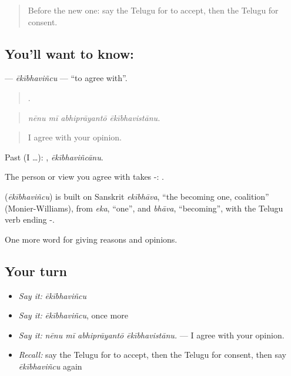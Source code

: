\label{lesson:TE-C385-ekibhavincu}



\begin{quote}
Before the new one: say the Telugu for to accept, then the Telugu for consent.
\end{quote}

\subsection*{You'll want to know: }
\textbf{} — \emph{ēkībhaviñcu} — \textquotedblleft{}to agree with\textquotedblright{}.

\begin{quote}
   .
\end{quote}

\begin{quote}
\emph{nēnu mī abhiprāyantō ēkībhavistānu.}
\end{quote}

\begin{quote}
I agree with your opinion.
\end{quote}

Past (I …): , \emph{ēkībhaviñcānu}.

The person or view you agree with takes -:  .

\begin{cousinweb}
\textbf{} (\emph{ēkībhaviñcu}) is built on Sanskrit \emph{ekībhāva}, \textquotedblleft{}the becoming one, coalition\textquotedblright{} (Monier-Williams), from \emph{eka}, \textquotedblleft{}one\textquotedblright{}, and \emph{bhāva}, \textquotedblleft{}becoming\textquotedblright{}, with the Telugu verb ending -.
\end{cousinweb}

\begin{grammarlens}[title={What you've built}]
One more word for giving reasons and opinions.
\end{grammarlens}

\subsection*{Your turn}
\begin{itemize}
\raggedright
  \item \emph{Say it:} \emph{ēkībhaviñcu}
  \item \emph{Say it:} \emph{ēkībhaviñcu}, once more
  \item \emph{Say it:} \emph{nēnu mī abhiprāyantō ēkībhavistānu.} — I agree with your opinion.
  \item \emph{Recall:} say the Telugu for to accept, then the Telugu for consent, then say \emph{ēkībhaviñcu} again
\end{itemize}

